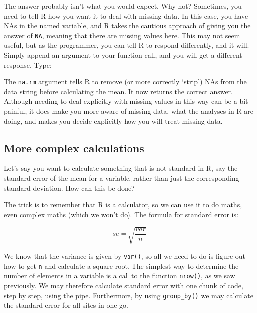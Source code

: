 \documentclass[]{book}
\newenvironment{Shaded}{\begin{snugshade}}{\end{snugshade}}
\newcommand{\KeywordTok}[1]{\textcolor[rgb]{0.13,0.29,0.53}{\textbf{#1}}}
\newcommand{\DataTypeTok}[1]{\textcolor[rgb]{0.13,0.29,0.53}{#1}}
\newcommand{\StringTok}[1]{\textcolor[rgb]{0.31,0.60,0.02}{#1}}
\newcommand{\OperatorTok}[1]{\textcolor[rgb]{0.81,0.36,0.00}{\textbf{#1}}}
\newcommand{\NormalTok}[1]{#1}
\theoremstyle{definition}
\theoremstyle{definition}
\theoremstyle{definition}
\theoremstyle{remark}
\begin{document}
The answer probably isn't what you would expect. Why not? Sometimes, you
need to tell R how you want it to deal with missing data. In this case,
you have NAs in the named variable, and R takes the cautious approach of
giving you the answer of \texttt{NA}, meaning that there are missing
values here. This may not seem useful, but as the programmer, you can
tell R to respond differently, and it will. Simply append an argument to
your function call, and you will get a different response. Type:

\begin{Shaded}
\end{Shaded}

The \texttt{na.rm} argument tells R to remove (or more correctly
`strip') NAs from the data string before calculating the mean. It now
returns the correct answer. Although needing to deal explicitly with
missing values in this way can be a bit painful, it does make you more
aware of missing data, what the analyses in R are doing, and makes you
decide explicitly how you will treat missing data.

\subsection{More complex calculations}\label{more-complex-calculations}

Let's say you want to calculate something that is not standard in R, say
the standard error of the mean for a variable, rather than just the
corresponding standard deviation. How can this be done?

The trick is to remember that R is a calculator, so we can use it to do
maths, even complex maths (which we won't do). The formula for standard
error is:

\[se = \sqrt{\frac{var}{n}}\]

We know that the variance is given by \texttt{var()}, so all we need to
do is figure out how to get \texttt{n} and calculate a square root. The
simplest way to determine the number of elements in a variable is a call
to the function \texttt{nrow()}, as we saw previously. We may therefore
calculate standard error with one chunk of code, step by step, using the
pipe. Furthermore, by using \texttt{group\_by()} we may calculate the
standard error for all sites in one go.
\end{document}
